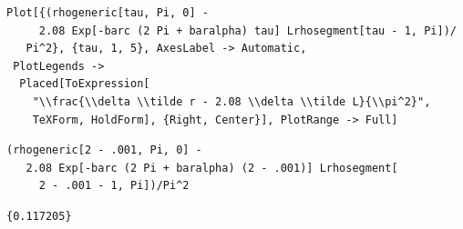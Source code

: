 \documentclass[reqno]{amsart}
\theoremstyle{definition} \newtheorem{definition}{Definition}[section]
\theoremstyle{definition} \newtheorem{remark}[definition]{Remark}
\theoremstyle{plain} \newtheorem{lemma}[definition]{Lemma}
\theoremstyle{plain} \newtheorem{proposition}[definition]{Proposition}
\theoremstyle{plain} \newtheorem{theorem}[definition]{Theorem}
\theoremstyle{plain} \newtheorem{corollary}[definition]{Corollary}
\theoremstyle{definition} \newtheorem{example}[definition]{Example}
\theoremstyle{plain} \newtheorem{claim}[clai]{Claim}
\theoremstyle{definition} \newtheorem{assumption}[definition]{Assumption}
\theoremstyle{definition} \newtheorem{observation}[definition]{Observation}
\newcommand{\1}{\mathbbm 1}
\numberwithin{equation}{section} %
\theoremstyle{plain} \newtheorem*{theorem*}{Theorem}
\theoremstyle{plain} \newtheorem{mthm}[maintheorem]{Main Theorem}
\theoremstyle{plain} \newtheorem*{mthm*}{Main Theorem}
\theoremstyle{plain} \newtheorem*{conjecture*}{Conjecture}
\theoremstyle{plain} \newtheorem{conjecture}[definition]{Conjecture}
\theoremstyle{plain} \newtheorem*{problem*}{Problem}
\begin{document}
\medskip
\begin{verbatim}
Plot[{(rhogeneric[tau, Pi, 0] - 
     2.08 Exp[-barc (2 Pi + baralpha) tau] Lrhosegment[tau - 1, Pi])/
   Pi^2}, {tau, 1, 5}, AxesLabel -> Automatic, 
 PlotLegends -> 
  Placed[ToExpression[
    "\\frac{\\delta \\tilde r - 2.08 \\delta \\tilde L}{\\pi^2}", 
    TeXForm, HoldForm], {Right, Center}], PlotRange -> Full]
\end{verbatim}
\begin{verbatim}
(rhogeneric[2 - .001, Pi, 0] - 
   2.08 Exp[-barc (2 Pi + baralpha) (2 - .001)] Lrhosegment[
     2 - .001 - 1, Pi])/Pi^2
\end{verbatim}
\begin{verbatim}
{0.117205}
\end{verbatim}

\bigskip


\bigskip
\end{document}
